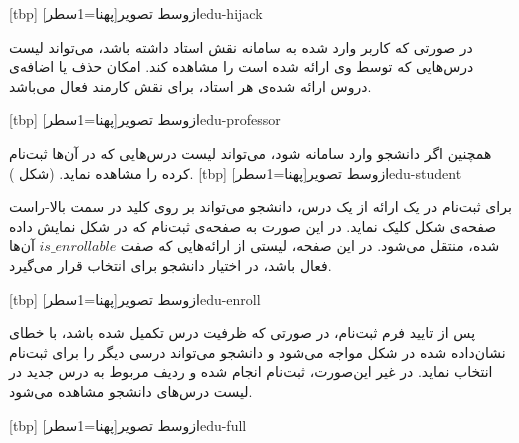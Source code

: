 [tbp]
‌ازوسط
‌تصویر[پهنا=1‌سطر]{edu-hijack}

در صورتی که کاربر وارد شده به سامانه نقش استاد داشته باشد، می‌تواند
لیست درس‌هایی که توسط وی ارائه شده است را مشاهده کند. امکان حذف یا
اضافه‌ی دروس ارائه شده‌ی هر استاد، برای نقش کارمند فعال می‌باشد.

[tbp]
‌ازوسط
‌تصویر[پهنا=1‌سطر]{edu-professor}

همچنین اگر دانشجو وارد سامانه شود، می‌تواند لیست درس‌هایی که در آن‌ها
ثبت‌نام کرده را مشاهده نماید. (شکل ).
[tbp]
‌ازوسط
‌تصویر[پهنا=1‌سطر]{edu-student}

برای ثبت‌نام در یک ارائه از یک درس، دانشجو می‌تواند بر روی کلید در سمت
بالا-راست صفحه‌ی شکل  کلیک نماید. در این صورت به
صفحه‌ی ثبت‌نام که در شکل  نمایش داده شده، منتقل
می‌شود. در این صفحه، لیستی از ارائه‌هایی که صفت $is\_enrollable$ آن‌ها
فعال باشد، در اختیار دانشجو برای انتخاب قرار می‌گیرد.

[tbp]
‌ازوسط
‌تصویر[پهنا=1‌سطر]{edu-enroll}

پس از تایید فرم ثبت‌نام، در صورتی که ظرفیت درس تکمیل شده باشد، با خطای
نشان‌داده شده در شکل  مواجه می‌شود و دانشجو می‌تواند
درسی دیگر را برای ثبت‌نام انتخاب نماید. در غیر این‌صورت، ثبت‌نام انجام
شده و ردیف مربوط به درس جدید در لیست درس‌های دانشجو مشاهده می‌شود.

[tbp]
‌ازوسط
‌تصویر[پهنا=1‌سطر]{edu-full}

                                                                    



